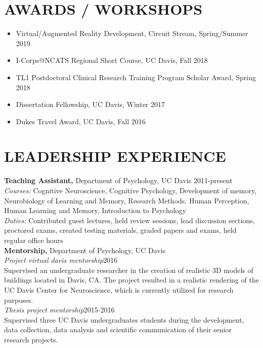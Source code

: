 \documentclass[line,margin,10pt]{res}
\begin{document}
\begin{resume}
\section{AWARDS / WORKSHOPS}
\begin{itemize} \itemsep -2pt
\item Virtual/Augmented Reality Development, Circuit Stream, Spring/Summer 2019
\item I-Corps@NCATS Regional Short Course, UC Davis, Fall 2018
\item TL1 Postdoctoral Clinical Research Training Program Scholar Award, Spring 2018
\item Dissertation Fellowship, UC Davis, Winter 2017
\item Dukes Travel Award, UC Davis, Fall 2016
\end{itemize}

\section{LEADERSHIP EXPERIENCE}
 \textbf{Teaching Assistant,} Department of Psychology, UC Davis \hfill 2011-present \\
\emph{Courses:} Cognitive Neuroscience, Cognitive Psychology, Development of memory, Neurobiology of Learning and Memory, Research Methods, Human Perception, Human Learning and Memory, Introduction to Psychology\\
\emph{Duties:} Contributed guest lectures, held review sessions, lead discussion sections, proctored exams, created testing materials, graded papers and exams, held regular office hours\\
\textbf{Mentorship,} Department of Psychology, UC Davis \\
\emph{Project virtual davis mentorship}\hfill 2016 \\
Supervised an undergraduate researcher in the creation of realistic 3D models of buildings located in Davis, CA. The project resulted in a realistic rendering of the UC Davis Center for Neuroscience, which is currently utilized for research purposes.\\
\emph{Thesis project mentorship}\hfill 2015-2016 \\
Supervised three UC Davis undergraduates students during the development, data collection, data analysis and scientific communication of their senior research projects.\\



\end{resume}
\end{document}
